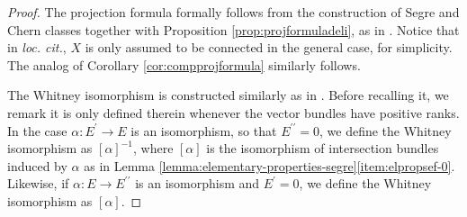 \documentclass[11pt]{article}
\providecommand{\loccit}{\emph{loc. cit.}}
\theoremstyle{plain}
\theoremstyle{definition}
\newcommand{\bis}{\prime\prime}
\begin{document}
\begin{proof}

The projection formula formally follows from the construction of Segre and Chern classes together with Proposition \ref{prop:projformuladeli}, as in
\cite[\textsection V.4.2]{Elkikfib}. Notice that in \loccit, $X$ is only assumed to be connected in the general case, for simplicity. The analog of Corollary \ref{cor:compprojformula} similarly follows.

The Whitney isomorphism is constructed similarly as in \cite[\textsection V.4.8]{Elkikfib}. Before recalling it, we remark it is only defined therein whenever the vector bundles have positive ranks. In the case $\alpha: E^{\prime} \to E$ is an isomorphism, so that $E^{\bis}=0$, we define the Whitney isomorphism as $[\alpha]^{-1}$, where $[\alpha]$ is the isomorphism of intersection bundles induced by $\alpha$ as in Lemma \ref{lemma:elementary-properties-segre}\eqref{item:elpropsef-0}. Likewise, if $\alpha: E\to E^{\bis}$ is an isomorphism and $E^{\prime}=0$, we define the Whitney isomorphism as $[\alpha]$.


\end{proof}
\end{document}

